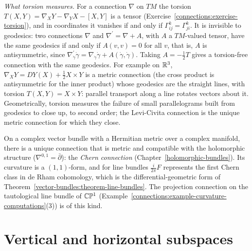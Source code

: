 \begin{remark}\label{connections:remark-torsion-meaning}
\emph{What torsion measures.} For a connection $\nabla$ on $TM$ the torsion $T(X, Y) = \nabla_XY - \nabla_YX - [X, Y]$ is a tensor (Exercise~\ref{connections:exercise-torsion}), and in coordinates it vanishes
if and only if $\Gamma^k_{ij} = \Gamma^k_{ji}$. It is invisible to geodesics: two connections $\nabla$ and $\nabla^{\prime} = \nabla + A$, with $A$ a $TM$-valued tensor, have the same geodesics if and only if
$A(v, v) = 0$ for all $v$, that is, $A$ is antisymmetric, since $\nabla^{\prime}_{\dot\gamma}\dot\gamma = \nabla_{\dot\gamma}\dot\gamma + A(\dot\gamma, \dot\gamma)$. Taking $A = -\frac12T$ gives a torsion-free connection
with the same geodesics. For example on $\mathbb{R}^3$, $\nabla_XY = DY(X) + \frac12X \times Y$ is a metric connection (the cross product is antisymmetric for the inner product) whose geodesics are the straight
lines, with torsion $T(X, Y) = X \times Y$: parallel transport along a line rotates vectors about it. Geometrically, torsion measures the failure of small parallelograms built from geodesics to close
up, to second order; the Levi-Civita connection is the unique metric connection for which they close.
\end{remark}

\begin{example}\label{connections:example-chern-connection}
On a complex vector bundle with a Hermitian metric over a complex manifold, there is a unique connection that is metric and compatible with the holomorphic structure ($\nabla^{0,1} = \bar\partial$): the
\emph{Chern connection} (Chapter~\ref{holomorphic-bundles}). Its curvature is a $(1,1)$-form, and for line bundles $\frac{i}{2\pi}F$ represents the first Chern class in de Rham cohomology, which is the
differential-geometric form of Theorem~\ref{vector-bundles:theorem-line-bundles}. The projection connection on the tautological line bundle of $\mathbb{C}\mathbb{P}^1$
(Example~\ref{connections:example-curvature-computations}(3)) is of this kind.
\end{example}


\section{Vertical and horizontal subspaces}\label{connections:section-horizontal}

